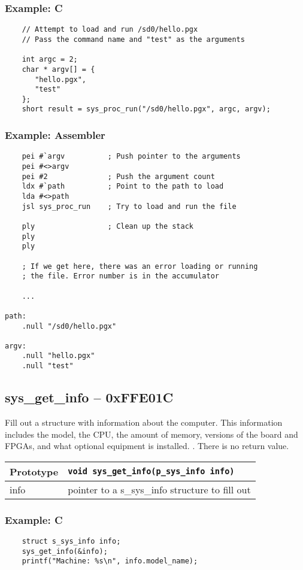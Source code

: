 \subsubsection*{Example: C}
\begin{lstlisting}
    // Attempt to load and run /sd0/hello.pgx
    // Pass the command name and "test" as the arguments

    int argc = 2;
    char * argv[] = {
       "hello.pgx",
       "test"
    };
    short result = sys_proc_run("/sd0/hello.pgx", argc, argv);
\end{lstlisting}

\subsubsection*{Example: Assembler}
\begin{verbatim}
    pei #`argv          ; Push pointer to the arguments
    pei #<>argv
    pei #2              ; Push the argument count
    ldx #`path          ; Point to the path to load
    lda #<>path
    jsl sys_proc_run    ; Try to load and run the file

    ply                 ; Clean up the stack
    ply
    ply

    ; If we get here, there was an error loading or running
    ; the file. Error number is in the accumulator

    ...

path:
    .null "/sd0/hello.pgx"

argv:
    .null "hello.pgx"
    .null "test"
\end{verbatim}


\subsection*{sys\_get\_info -- 0xFFE01C}
Fill out a structure with information about the computer. This information includes the model, the CPU, the amount of memory, versions of the board and FPGAs, and what optional equipment is installed.
.
There is no return value.

\bigskip

\begin{tabular}{|l||l|} \hline
Prototype & \lstinline!void sys_get_info(p_sys_info info)! \\ \hline
info & pointer to a s\_sys\_info structure to fill out \\ \hline
\end{tabular}

\subsubsection*{Example: C}
\begin{lstlisting}
    struct s_sys_info info;
    sys_get_info(&info);
    printf("Machine: %s\n", info.model_name);	
\end{lstlisting}

